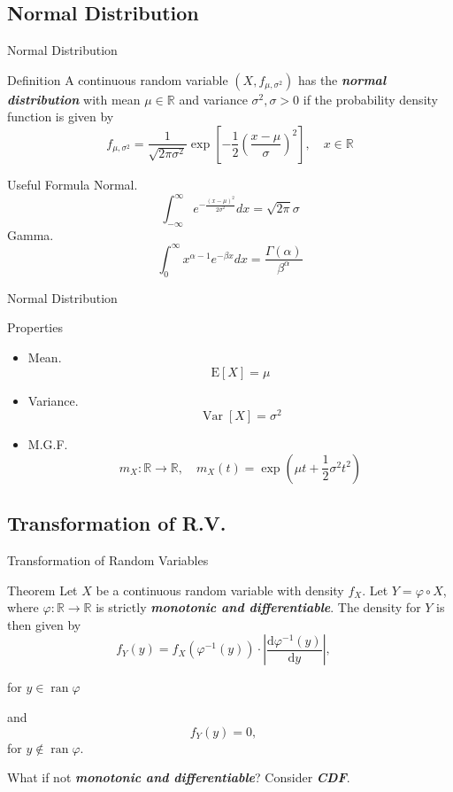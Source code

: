 \documentclass{beamer}
\newcommand{\bb}[1]{\textcolor{antiquefuchsia}{\textbf{\textit{#1}}}}
\begin{document}
\subsection{Normal Distribution}
\begin{frame}{Normal Distribution}
\begin{block}{Definition}
A continuous random variable $\left(X, f_{\mu, \sigma^{2}}\right)$ has the \bb{normal distribution} with mean $\mu \in \mathbb{R}$ and variance $\sigma^{2}, \sigma>0$ if the probability density function is given by
$$
f_{\mu, \sigma^{2}}=\frac{1}{\sqrt{2 \pi \sigma^{2}}} \exp \left[-\frac{1}{2}\left(\frac{x-\mu}{\sigma}\right)^{2}\right], \quad x \in \mathbb{R}
$$
\end{block}
\begin{block}{Useful Formula}
Normal.
$$
\int_{-\infty}^{\infty} e^{-\frac{(x-\mu)^{2}}{2 \sigma^{2}}} d x=\sqrt{2 \pi} \sigma
$$
Gamma.
$$
\int_{0}^{\infty} x^{\alpha-1} e^{-\beta x} d x=\frac{\Gamma(\alpha)}{\beta^{\alpha}}
$$
\end{block}
\end{frame}

\begin{frame}{Normal Distribution}
\begin{block}{Properties}
\begin{itemize}
\item Mean.
$$
\mathrm{E}[X]=\mu
$$
\item Variance.
$$
\operatorname{Var}[X]=\sigma^{2}
$$
\item M.G.F.
$$
m_{X}: \mathbb{R} \rightarrow \mathbb{R}, \quad m_{X}(t)=\exp \left(\mu t+\frac{1}{2} \sigma^{2} t^{2}\right)
$$
\end{itemize}
\end{block} 
\end{frame}

\subsection{Transformation of R.V.}
\begin{frame}{Transformation of Random Variables}
\begin{block}{Theorem}
Let $X$ be a continuous random variable with density $f_{X}$. Let $Y=\varphi \circ X$, where $\varphi: \mathbb{R} \rightarrow \mathbb{R}$ is strictly \bb{monotonic and differentiable}. The density for $Y$ is then given by
$$f_{Y}(y)=f_{X}\left(\varphi^{-1}(y)\right) \cdot\left|\frac{\mathrm{d} \varphi^{-1}(y)}{\mathrm{d} y}\right|, \quad$$

for $y \in \operatorname{ran} \varphi$


and $$f_{Y}(y)=0, \quad$$ for $y \notin \operatorname{ran} \varphi .$
\end{block}
What if not \bb{monotonic and differentiable}? Consider \bb{CDF}.
\end{frame}
\end{document}
